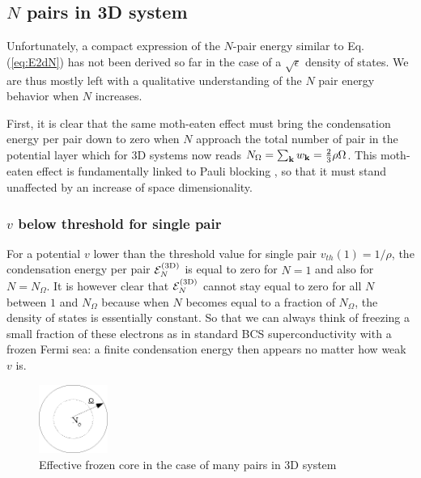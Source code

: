 \documentclass[3p,twocolumn]{elsarticle}
\begin{document}
\subsection{$N$ pairs in 3D system}
Unfortunately, a  compact expression of the $N$-pair energy similar to Eq. (\ref{eq:E2dN}) has not been derived so far in the case of a $\sqrt{\epsilon}$ density of states. We are thus mostly left with a qualitative understanding of the $N$ pair energy  behavior when $N$ increases. 

First, it is clear that the same moth-eaten effect must bring the condensation energy per pair down to zero when $N$ approach the total number of pair in the potential layer which for 3D systems now reads $N_\Omega=\sum_{\mathbf{k}}w_{\mathbf{k}}=\frac{2}{3}\rho\Omega$. This moth-eaten effect is fundamentally linked to  Pauli blocking , so that it must stand unaffected by an increase of space dimensionality. 

\subsubsection{$v$ below threshold for single pair}
For a potential $v$ lower than the threshold value for single pair $v_{th}(1)=1/\rho$, the condensation energy per pair $\mathcal{E}_N^{{\text{(3D)}}}$ is equal to zero for $N=1$ and also for $N=N_\Omega$.  It is however clear that $\mathcal{E}_N^{{\text{(3D)}}}$ cannot stay equal to zero for all $N$ between $1$ and $N_\Omega$ because when $N$ becomes equal to a fraction of $N_\Omega$, the density of states is essentially constant.  So that we can always think of  freezing a small fraction of these electrons as in standard BCS superconductivity with a frozen Fermi sea: a finite condensation energy then  appears no matter how weak $v$ is. 

\begin{figure}[htb]
	\centering
		\includegraphics[width=0.20\textwidth]{potential.eps}
	\caption{Effective frozen core in the case of many pairs in 3D system}
	\label{fig:potential}
\end{figure}
\end{document}
